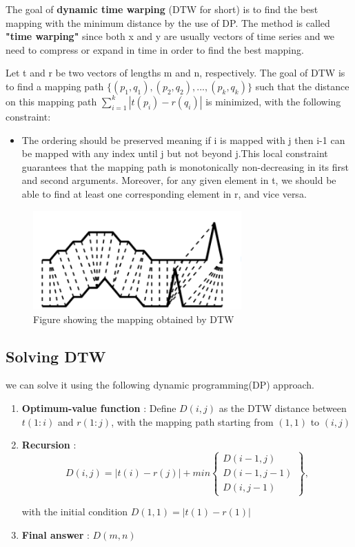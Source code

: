 The goal of \textbf{dynamic time warping} (DTW for short) is to find the best mapping with the minimum distance by the use of DP. The method is called \textbf{"time warping"} since both x and y are usually vectors of time series and we need to compress or expand in time in order to find the best mapping.

Let t and r be two vectors of lengths m and n, respectively. The goal of DTW is to find a mapping path \( \{(p_1, q_1), (p_2, q_2), ..., (p_k, q_k)\} \)  such that the distance on this mapping path \textbf{\( \sum_{i=1}^k |t(p_i)-r(q_i)|\)} is minimized, with the following constraint:
\begin{itemize}
    \item The ordering should be preserved meaning if i is mapped with j then i-1 can be mapped with any index until j but not beyond j.This local constraint guarantees that the mapping path is monotonically non-decreasing in its first and second arguments. Moreover, for any given element in t, we should be able to find at least one corresponding element in r, and vice versa.  
\end{itemize}

\begin{figure} [!htbp]
\centering
\includegraphics[width=80mm]{Pictures/dtw.png}
\caption{Figure showing the mapping obtained by DTW}
\end{figure}


\subsection{Solving DTW}

we can solve it using the following dynamic programming(DP) approach.

\begin{enumerate}
    \item \textbf{Optimum-value function} : Define $D(i,j)$ as the DTW distance between $t(1:i)$ and $r(1:j)$, with the mapping path starting from $(1,1)$ to $(i,j)$
    
    \item \textbf{Recursion} :
    \[D(i, j)=|t(i) - r(j)| + min \left\{\begin{matrix} D(i-1, j)\\D(i-1, j-1)\\D(i, j-1) \end{matrix}\right\},\]
    
     with the initial condition \(D(1, 1)=|t(1)-r(1)|\)
    \item \textbf{Final answer} : $D(m,n)$
\end{enumerate}

